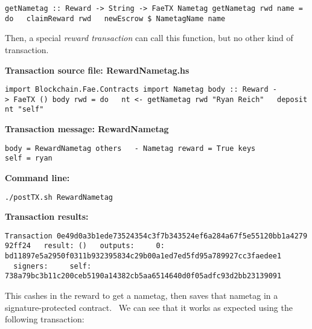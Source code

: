 \documentclass[11pt]{article}
\newcommand{\codeblock}[1]{\begin{mdframed}[
    backgroundcolor=header-color,
    linecolor=header-color,
    innertopmargin=10pt,
    ]{\texttt{#1}}\end{mdframed}}
\begin{document}
\codeblock{getNametag :: Reward -\textgreater{} String -\textgreater{} FaeTX Nametag\newline
getNametag rwd name = do\newline
  claimReward rwd\newline
  newEscrow \$ NametagName name}

Then, a special \textit{reward transaction} can call this function, but no other kind of transaction.


\vspace{11pt}

\textbf{Transaction source file: RewardNametag.hs}

\codeblock{import Blockchain.Fae.Contracts\newline
import Nametag\newline
\newline
body :: Reward -\textgreater{} FaeTX ()\newline
body rwd = do\newline
  nt \textless{}- getNametag rwd "Ryan Reich"\newline
  deposit nt "self"}

\textbf{Transaction message: RewardNametag}

\codeblock{body = RewardNametag\newline
others\newline
  - Nametag\newline
reward = True\newline
keys\newline
  self = ryan}

\textbf{Command line:}

\codeblock{.\slash{}postTX.sh RewardNametag}

\textbf{Transaction results:}

\codeblock{Transaction 0e49d0a3b1ede73524354c3f7b343524ef6a284a67f5e55120bb1a427992ff24\newline
  result: ()\newline
  outputs:\newline
    0: bd11897e5a2950f0311b932395834c29b00a1ed7ed5fd95a789927cc3faedee1\newline
  signers:\newline
    self: 738a79bc3b11c200ceb5190a14382cb5aa6514640d0f05adfc93d2bb23139091}

This cashes in the reward to get a nametag, then saves that nametag in a signature-protected contract.  We can see that it works as expected using the following transaction:
\end{document}
